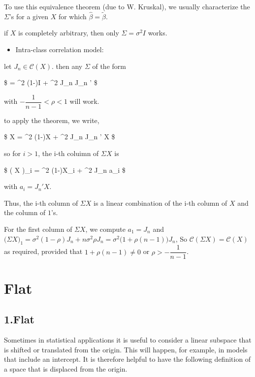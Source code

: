 \documentclass[
]{book}
\providecommand{\tightlist}{%
  \setlength{\itemsep}{0pt}\setlength{\parskip}{0pt}}
\begin{document}
{{{To use this equivalence theorem (due to W. Kruskal), we usually characterize the \(\Sigma\)'s for a given \(X\) for which \(\hat \beta = \tilde \beta\).

if \(X\) is completely arbitrary, then only \(\Sigma = \sigma^2 I\) works.

\begin{itemize}
\tightlist
\item
  Intra-class correlation model:
\end{itemize}

let \(J_n \in \mathcal{C}(X)\). then any \(\Sigma\) of the form

\$
\Sigma = \sigma\^{}2 (1-\rho)I + \sigma\^{}2 \rho J\_n J\_n '
\$

with \(-\dfrac{1}{n-1} < \rho < 1\) will work.

to apply the theorem, we write,

\$
\Sigma X = \sigma\^{}2 (1-\rho)X + \sigma\^{}2 \rho J\_n J\_n ' X
\$

so for \(i>1\), the i-th coluimn of \(\Sigma X\) is

\$
\Big( \Sigma X \Big)\_i = \sigma\^{}2 (1-\rho)X\_i + \sigma\^{}2 \rho J\_n a\_i
\$

with \(a_i = J_n ' X\).

Thus, the i-th column of \(\Sigma X\) is a linear combination of the i-th column of \(X\) and the column of \(1\)'s.

For the first column of \(\Sigma X\), we compute \(a_1 = J_n\) and \(\Big ( \Sigma X \Big)_1 = \sigma^2 (1- \rho) J_n + n \sigma^2 \rho J_n = \sigma^2 \Big ( 1 + \rho(n-1) \Big )J_n\), So \(\mathcal{C}(\Sigma X) = \mathcal{C}(X)\) as required, provided that \(1+\rho(n-1) \not = 0\) or \(\rho > -\dfrac{1}{n-1}\).

\hypertarget{flat}{%
\section{Flat}\label{flat}}

\hypertarget{flat-1}{%
\subsection{1.Flat}\label{flat-1}}

Sometimes in statistical applications it is useful to consider a linear subspace that is shifted or translated from the origin. This will happen, for example, in models that include an intercept. It is therefore helpful to have the following definition of a space that is displaced from the origin.

}}}
\end{document}
